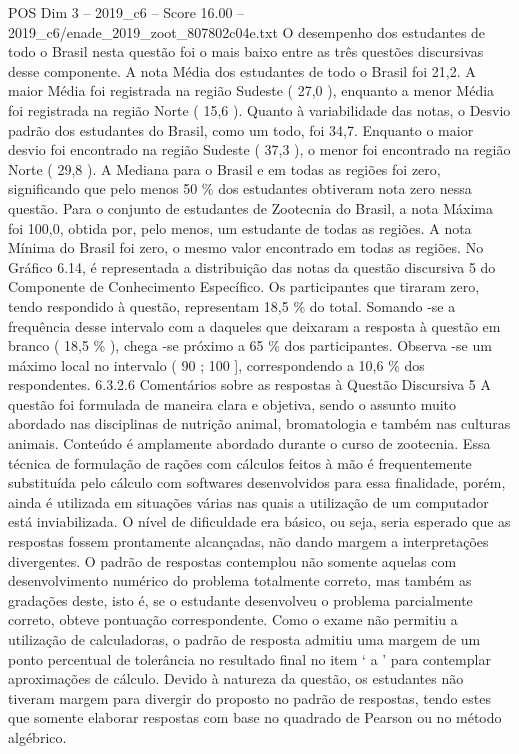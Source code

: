 \begin{textsample}{POS Dim 3 – 2019\_c6 – Score 16.00 – 2019\_c6/enade\_2019\_zoot\_807802c04e.txt}
O desempenho dos estudantes de todo o Brasil nesta questão foi o mais baixo entre as três questões discursivas desse componente.
A nota Média dos estudantes de todo o Brasil foi 21,2.
A maior Média foi registrada na região Sudeste ( 27,0 ), enquanto a menor Média foi registrada na região Norte ( 15,6 ).
Quanto à variabilidade das notas, o Desvio padrão dos estudantes do Brasil, como um todo, foi 34,7.
Enquanto o maior desvio foi encontrado na região Sudeste ( 37,3 ), o menor foi encontrado na região Norte ( 29,8 ).
A Mediana para o Brasil e em todas as regiões foi zero, significando que pelo menos 50 \% dos estudantes obtiveram nota zero nessa questão.
Para o conjunto de estudantes de Zootecnia do Brasil, a nota Máxima foi 100,0, obtida por, pelo menos, um estudante de todas as regiões.
A nota Mínima do Brasil foi zero, o mesmo valor encontrado em todas as regiões.
No Gráfico 6.14, é representada a distribuição das notas da questão discursiva 5 do Componente de Conhecimento Específico.
Os participantes que tiraram zero, tendo respondido à questão, representam 18,5 \% do total.
Somando -se a frequência desse intervalo com a daqueles que deixaram a resposta à questão em branco ( 18,5 \% ), chega -se próximo a 65 \% dos participantes.
Observa -se um máximo local no intervalo ( 90 ; 100 ], correspondendo a 10,6 \% dos respondentes. 6.3.2.6 Comentários sobre as respostas à Questão Discursiva 5 A questão foi formulada de maneira clara e objetiva, sendo o assunto muito abordado nas disciplinas de nutrição animal, bromatologia e também nas culturas animais.
Conteúdo é amplamente abordado durante o curso de zootecnia.
Essa técnica de formulação de rações com cálculos feitos à mão é frequentemente substituída pelo cálculo com softwares desenvolvidos para essa finalidade, porém, ainda é utilizada em situações várias nas quais a utilização de um computador está inviabilizada.
O nível de dificuldade era básico, ou seja, seria esperado que as respostas fossem prontamente alcançadas, não dando margem a interpretações divergentes.
O padrão de respostas contemplou não somente aquelas com desenvolvimento numérico do problema totalmente correto, mas também as gradações deste, isto é, se o estudante desenvolveu o problema parcialmente correto, obteve pontuação correspondente.
Como o exame não permitiu a utilização de calculadoras, o padrão de resposta admitiu uma margem de um ponto percentual de tolerância no resultado final no item ‘ a ’ para contemplar aproximações de cálculo.
Devido à natureza da questão, os estudantes não tiveram margem para divergir do proposto no padrão de respostas, tendo estes que somente elaborar respostas com base no quadrado de Pearson ou no método algébrico.

\end{textsample}
